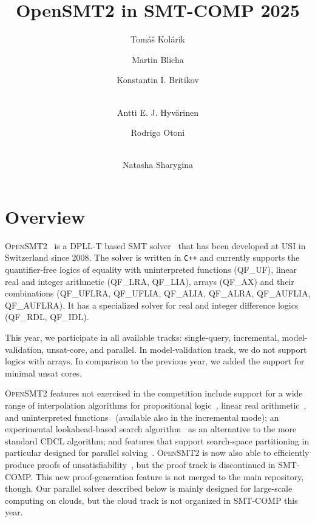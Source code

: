 \documentclass{easychair}
\title{OpenSMT2 in SMT-COMP 2025}
\author{
Tomáš Kolárik\inst{1} \and
Martin Blicha\inst{1,3} \and
Konstantin I. Britikov\inst{1} \and
\\
Antti E. J. Hyv{\"a}rinen\inst{2} \and
Rodrigo Otoni\inst{1} \and
\\
Natasha Sharygina\inst{1} \\
}
\institute{Universit{\`a} della Svizzera italiana (USI), Lugano,
Switzerland \and Certora \and Ethereum Foundation}
\date{}
\newcommand{\qflra}{QF\_LRA}
\newcommand{\qflia}{QF\_LIA}
\newcommand{\qfuf}{QF\_UF}
\newcommand{\qfbv}{QF\_BV}
\newcommand{\qfrdl}{QF\_RDL}
\newcommand{\qfidl}{QF\_IDL}
\newcommand{\qfuflra}{QF\_UFLRA}
\newcommand{\qfuflia}{QF\_UFLIA}
\newcommand{\qfax}{QF\_AX}
\newcommand{\qfauflia}{QF\_AUFLIA}
\newcommand{\qfauflra}{QF\_AUFLRA}
\newcommand{\qfalia}{QF\_ALIA}
\newcommand{\qfalra}{QF\_ALRA}
\newcommand{\opensmt}{\textsc{OpenSMT2}\xspace}
\begin{document}
\maketitle

\section{Overview}

\opensmt~\cite{HyvarinenMAS16} is a DPLL-T based SMT
solver~\cite{NieuwenhuisOT:JACM06}
that has been developed at USI in Switzerland since 2008.
The solver is written in \texttt{C++} and
currently supports the quantifier-free logics of equality with
uninterpreted functions (\qfuf), linear real and integer arithmetic
(\qflra, \qflia), arrays (\qfax) and their combinations (\qfuflra, \qfuflia, \qfalia, \qfalra, \qfauflia, \qfauflra).
It has a specialized solver for real and integer difference logics (\qfrdl,
\qfidl).

This year, we participate in all available tracks:
single-query, incremental, model-validation, unsat-core,
and parallel. %
In model-validation track, we do not support logics with arrays.
In comparison to the previous year,
we added the support for minimal unsat cores.

\opensmt features not exercised in the competition include support for a
wide range of interpolation algorithms for propositional
logic~\cite{AltFHS:VSTTE2015}, linear real
arithmetic~\cite{BlichaHKS19}, and uninterpreted
functions~\cite{AltHAS:FMCAD17} (available also in the incremental
mode); an experimental look\-ahead-based search
algorithm~\cite{HyvarinenMSCS18} as an alternative to the more standard
CDCL algorithm; and features that support search-space partitioning in
particular designed for parallel solving~\cite{HyvarinenMS:SAT15}.
\opensmt is now also able to efficiently produce proofs of
unsatisfiability~\cite{OtoniBEHS:DAC21},
but the proof track is discontinued in SMT-COMP.
This new proof-generation feature is not merged to the main repository, though.
Our parallel solver described below is mainly designed for large-scale computing on clouds,
but the cloud track is not organized in SMT-COMP this year.
\end{document}
